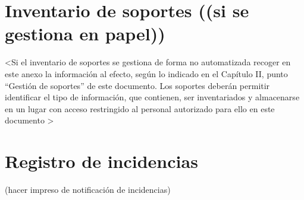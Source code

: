 \documentclass[a4paper,11pt,bibtotoc,noliststotoc]{scrbook}
\begin{document}
\chapter{Inventario de soportes ((si se gestiona en papel))}

<Si el inventario de soportes se gestiona de forma no automatizada recoger en este
anexo la información al efecto, según lo indicado en el Capítulo II, punto “Gestión de
soportes” de este documento. Los soportes deberán permitir identificar el tipo de
información, que contienen, ser inventariados y almacenarse en un lugar con acceso
restringido al personal autorizado para ello en este documento >







\chapter{Registro de incidencias}
(hacer impreso de notificación de incidencias)




\backmatter


\end{document}
